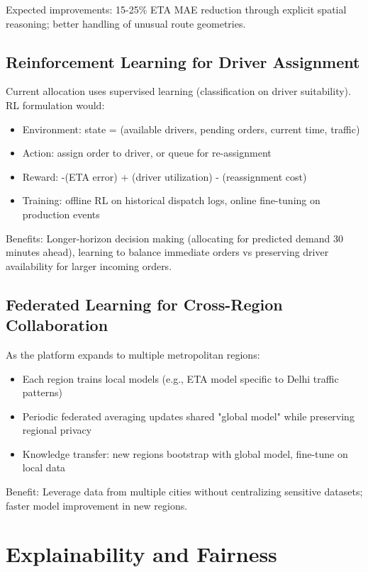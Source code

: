 \documentclass[12pt,a4paper]{report}
\begin{document}
\begin{itemize}
Expected improvements: 15-25\% ETA MAE reduction through explicit spatial reasoning; better handling of unusual route geometries.

\subsection{Reinforcement Learning for Driver Assignment}

Current allocation uses supervised learning (classification on driver suitability). RL formulation would:
\begin{itemize}
    \item Environment: state = (available drivers, pending orders, current time, traffic)
    \item Action: assign order to driver, or queue for re-assignment
    \item Reward: -(ETA error) + (driver utilization) - (reassignment cost)
    \item Training: offline RL on historical dispatch logs, online fine-tuning on production events
\end{itemize}

Benefits: Longer-horizon decision making (allocating for predicted demand 30 minutes ahead), learning to balance immediate orders vs preserving driver availability for larger incoming orders.

\subsection{Federated Learning for Cross-Region Collaboration}

As the platform expands to multiple metropolitan regions:
\begin{itemize}
    \item Each region trains local models (e.g., ETA model specific to Delhi traffic patterns)
    \item Periodic federated averaging updates shared "global model" while preserving regional privacy
    \item Knowledge transfer: new regions bootstrap with global model, fine-tune on local data
\end{itemize}

Benefit: Leverage data from multiple cities without centralizing sensitive datasets; faster model improvement in new regions.

\section{Explainability and Fairness}


\end{itemize}
\end{document}
